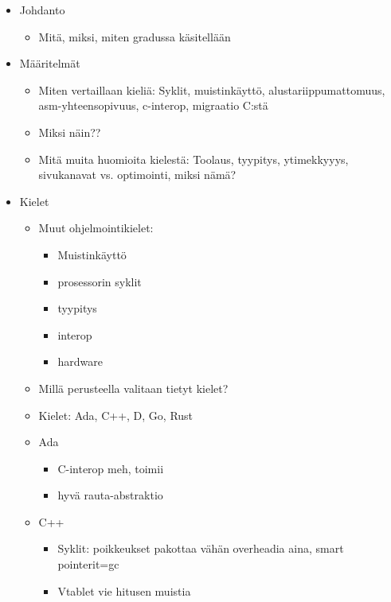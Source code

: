 \begin{itemize}
    \item Johdanto 
        \begin{itemize}
            \item Mitä, miksi, miten gradussa käsitellään
        \end{itemize}
    \item Määritelmät 
        \begin{itemize}
            \item Miten vertaillaan kieliä: Syklit, muistinkäyttö,
                alustariippumattomuus, asm-yhteensopivuus, c-interop, migraatio C:stä
            \item Miksi näin??
            \item Mitä muita huomioita kielestä: Toolaus, tyypitys,
                ytimekkyyys, sivukanavat vs. optimointi, miksi nämä?
        \end{itemize}
    \item Kielet 
        \begin{itemize}
            \item Muut ohjelmointikielet:
                \begin{itemize}
                    \item Muistinkäyttö
                    \item prosessorin syklit
                    \item tyypitys
                    \item interop
                    \item hardware
                \end{itemize}
            \item Millä perusteella valitaan tietyt kielet?
            \item Kielet: Ada, C++, D, Go, Rust 
            \item Ada
                \begin{itemize}
                    \item C-interop meh, toimii
                    \item hyvä rauta-abstraktio
                \end{itemize}
            \item C++
                \begin{itemize}
                    \item Syklit: poikkeukset pakottaa vähän overheadia aina, smart pointerit=gc
                    \item Vtablet vie hitusen muistia

\end{itemize}
\end{itemize}
\end{itemize}
